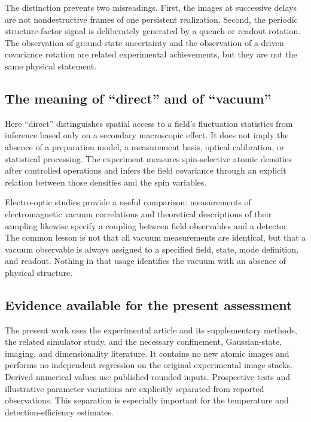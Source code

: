 \documentclass[11pt,a4paper]{article}
\theoremstyle{definition}
\theoremstyle{remark}
\begin{document}
The distinction prevents two misreadings. First, the images at successive delays are not nondestructive frames of one persistent realization. Second, the periodic structure-factor signal is deliberately generated by a quench or readout rotation. The observation of ground-state uncertainty and the observation of a driven covariance rotation are related experimental achievements, but they are not the same physical statement.\cite{zhang2026}

\subsection{The meaning of ``direct'' and of ``vacuum''}
Here ``direct'' distinguishes spatial access to a field's fluctuation statistics from inference based only on a secondary macroscopic effect. It does not imply the absence of a preparation model, a measurement basis, optical calibration, or statistical processing. The experiment measures spin-selective atomic densities after controlled operations and infers the field covariance through an explicit relation between those densities and the spin variables.\cite{zhang2026,hung}

Electro-optic studies provide a useful comparison: measurements of electromagnetic vacuum correlations and theoretical descriptions of their sampling likewise specify a coupling between field observables and a detector. The common lesson is not that all vacuum measurements are identical, but that a vacuum observable is always assigned to a specified field, state, mode definition, and readout. Nothing in that usage identifies the vacuum with an absence of physical structure.\cite{benea,moskalenko}

\subsection{Evidence available for the present assessment}
The present work uses the experimental article and its supplementary methods, the related simulator study, and the necessary confinement, Gaussian-state, imaging, and dimensionality literature. It contains no new atomic images and performs no independent regression on the original experimental image stacks. Derived numerical values use published rounded inputs. Prospective tests and illustrative parameter variations are explicitly separated from reported observations. This separation is especially important for the temperature and detection-efficiency estimates.\cite{zhang2026}
\end{document}
